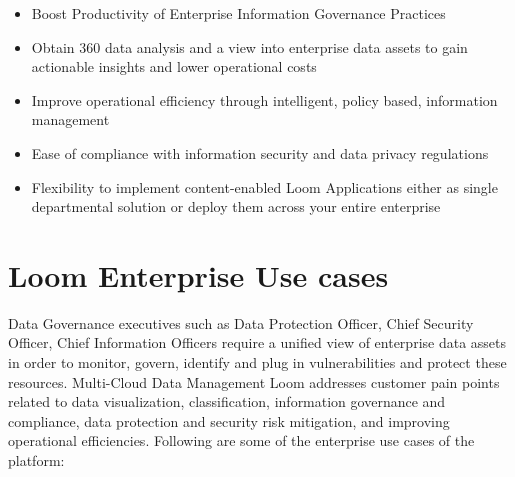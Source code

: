 \documentclass[letterpaper,10pt,english]{sphinxhowto}
\begin{document}
\begin{itemize}
\item {} 
Boost Productivity of Enterprise Information Governance Practices

\item {} 
Obtain 360 data analysis and a view into enterprise data assets to gain actionable insights and lower operational costs

\item {} 
Improve operational efficiency through intelligent, policy based, information management

\item {} 
Ease of compliance with information security and data privacy regulations

\item {} 
Flexibility to implement content-enabled Loom Applications either as single departmental solution or deploy them across your entire enterprise

\end{itemize}


\section{Loom Enterprise Use cases}
\label{\detokenize{col/ds/mcdmp_ds_opt2:loom-enterprise-use-cases}}
Data Governance executives such as Data Protection Officer, Chief Security Officer, Chief Information Officers require a unified view of enterprise data assets in order to monitor, govern, identify and plug in vulnerabilities and protect these resources. Multi-Cloud Data Management Loom addresses customer pain points related to data visualization, classification, information governance and compliance, data protection and security risk mitigation, and improving operational efficiencies.  Following are some of the enterprise use cases of the platform:
\end{document}
